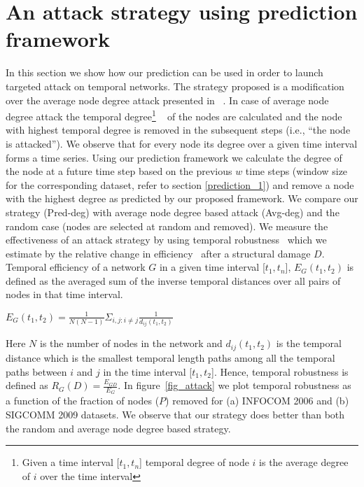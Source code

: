 \noindent

\section{An attack strategy using prediction framework}
\label{attack}
In this section we show how our prediction can be used in order to launch targeted attack on temporal networks. The strategy proposed is a modification over the average node degree attack presented in ~\cite{trajanovski2012error}. 
In case of average node degree attack the temporal degree\footnote{Given a time interval [$t_1, t_n$] temporal degree of node $i$ is the average degree of $i$ over the time interval}  
~\cite{trajanovski2012error} of the nodes are calculated and the node with highest temporal degree is removed in the 
subsequent steps (i.e., ``the node is attacked''). 
We observe that for every 
node its degree over a given time interval forms a time series. Using our prediction framework we calculate the degree of the node at a future time step based on the previous 
$w$ time steps (window size for the corresponding dataset, refer to section \ref{prediction_1})
and remove a node with the 
highest degree as predicted by our proposed framework. We compare our strategy (Pred-deg) with average node degree based attack (Avg-deg) and the random case (nodes are selected at random 
and removed). 
We measure the effectiveness of an attack strategy by using temporal robustness~\cite{trajanovski2012error} which we estimate by the relative change in efficiency~\cite{trajanovski2012error} 
after a structural damage $D$. 
Temporal efficiency of a network $G$ in a given time interval [$t_1,t_n$], $E_G(t_1,t_2)$ is defined as the averaged sum of the inverse temporal distances over all pairs of 
nodes in that time interval. 
\begin{center}
 $E_G(t_1,t_2)=\frac{1}{N(N-1)}\Sigma_{i,j:i\neq j}\frac{1}{d_{ij}(t_1,t_2)}$
\end{center}
Here $N$ is the number of nodes in the network and $d_{ij}(t_1,t_2)$ is the temporal distance which is the smallest temporal length paths among all the temporal
paths between $i$ and $j$ in the time interval [$t_1,t_2$]. Hence, temporal robustness is defined  as $R_G(D)=\frac{E_{GD}}{E_G}$. 
In figure~\ref{fig_attack} we plot temporal robustness 
as a function of the fraction of nodes ($P$) removed 
for (a) INFOCOM 2006 and (b) SIGCOMM 2009 datasets. 
We observe that our strategy 
does better than both the random and average node degree based strategy. 

